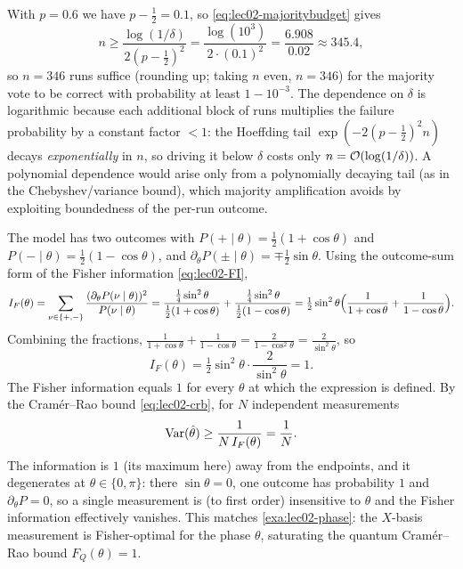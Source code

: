 \begin{solution}
With $p=0.6$ we have $p-\tfrac12=0.1$, so \eqref{eq:lec02-majoritybudget} gives
\[
  n\ge\frac{\log(1/\delta)}{2(p-\tfrac12)^{2}}
    =\frac{\log(10^{3})}{2\cdot(0.1)^{2}}
    =\frac{6.908}{0.02}\approx345.4,
\]
so $n=346$ runs suffice (rounding up; taking $n$ even, $n=346$) for the majority
vote to be correct with probability at least $1-10^{-3}$. The dependence on $\delta$
is logarithmic because each additional block of runs multiplies the failure
probability by a constant factor $<1$: the Hoeffding tail
$\exp(-2(p-\tfrac12)^{2}n)$ decays \emph{exponentially} in $n$, so driving it below
$\delta$ costs only $n=\mathcal{O}(\log(1/\delta))$. A polynomial dependence would arise
only from a polynomially decaying tail (as in the Chebyshev/variance bound), which
majority amplification avoids by exploiting boundedness of the per-run outcome.
\end{solution}

\begin{solution}
The model has two outcomes with $P(+\mid\theta)=\tfrac12(1+\cos\theta)$ and
$P(-\mid\theta)=\tfrac12(1-\cos\theta)$, and $\partial_\theta P(\pm\mid\theta)=
\mp\tfrac12\sin\theta$. Using the outcome-sum form of the Fisher information
\eqref{eq:lec02-FI},
\[
  I_F(\theta)=\sum_{\nu\in\{+,-\}}\frac{(\partial_\theta P(\nu\mid\theta))^{2}}{P(\nu\mid\theta)}
   =\frac{\tfrac14\sin^{2}\theta}{\tfrac12(1+\cos\theta)}
    +\frac{\tfrac14\sin^{2}\theta}{\tfrac12(1-\cos\theta)}
   =\tfrac12\sin^{2}\theta\Bigl(\frac{1}{1+\cos\theta}+\frac{1}{1-\cos\theta}\Bigr).
\]
Combining the fractions,
$\frac{1}{1+\cos\theta}+\frac{1}{1-\cos\theta}=\frac{2}{1-\cos^{2}\theta}
=\frac{2}{\sin^{2}\theta}$, so
\[
  I_F(\theta)=\tfrac12\sin^{2}\theta\cdot\frac{2}{\sin^{2}\theta}=1.
\]
The Fisher information equals $1$ for every $\theta$ at which the expression is
defined. By the Cram\'er--Rao bound \eqref{eq:lec02-crb}, for $N$ independent
measurements
\[
  \operatorname{Var}(\hat\theta)\ge\frac{1}{N\,I_F(\theta)}=\frac1N.
\]
The information is $1$ (its maximum here) away from the endpoints, and it degenerates
at $\theta\in\{0,\pi\}$: there $\sin\theta=0$, one outcome has probability $1$ and
$\partial_\theta P=0$, so a single measurement is (to first order) insensitive to
$\theta$ and the Fisher information effectively vanishes. This matches
\cref{exa:lec02-phase}: the $X$-basis measurement is Fisher-optimal for the phase
$\theta$, saturating the quantum Cram\'er--Rao bound $F_Q(\theta)=1$.
\end{solution}

